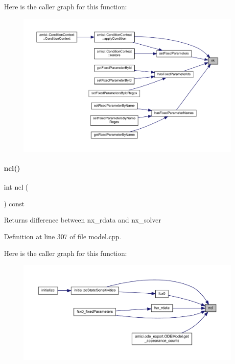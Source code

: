 Here is the caller graph for this function\+:
\nopagebreak
\begin{figure}[H]
\begin{center}
\leavevmode
\includegraphics[width=350pt]{classamici_1_1_model_a3d4130da64883565a06a86e7d6029da1_icgraph}
\end{center}
\end{figure}
\mbox{\label{classamici_1_1_model_a158b8a049de50ecddfe5cd120ff549ac}} 
\paragraph{\texorpdfstring{ncl()}{ncl()}}
{\footnotesize\ttfamily int ncl (\begin{DoxyParamCaption}{ }\end{DoxyParamCaption}) const}

\begin{DoxyReturn}{Returns}
difference between nx\+\_\+rdata and nx\+\_\+solver 
\end{DoxyReturn}


Definition at line 307 of file model.\+cpp.

Here is the caller graph for this function\+:
\nopagebreak
\begin{figure}[H]
\begin{center}
\leavevmode
\includegraphics[width=350pt]{classamici_1_1_model_a158b8a049de50ecddfe5cd120ff549ac_icgraph}
\end{center}
\end{figure}
\mbox{\label{classamici_1_1_model_adde50e0d8a99d20354c8403bf93fab6f}} 
